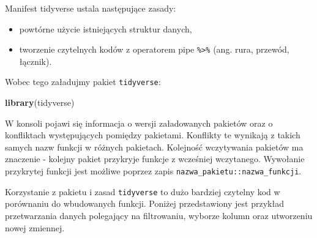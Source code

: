 \documentclass[]{book}
\newenvironment{Shaded}{\begin{snugshade}}{\end{snugshade}}
\newcommand{\KeywordTok}[1]{\textcolor[rgb]{0.13,0.29,0.53}{\textbf{#1}}}
\newcommand{\DataTypeTok}[1]{\textcolor[rgb]{0.13,0.29,0.53}{#1}}
\newcommand{\DecValTok}[1]{\textcolor[rgb]{0.00,0.00,0.81}{#1}}
\newcommand{\StringTok}[1]{\textcolor[rgb]{0.31,0.60,0.02}{#1}}
\newcommand{\CommentTok}[1]{\textcolor[rgb]{0.56,0.35,0.01}{\textit{#1}}}
\newcommand{\OperatorTok}[1]{\textcolor[rgb]{0.81,0.36,0.00}{\textbf{#1}}}
\newcommand{\NormalTok}[1]{#1}
\providecommand{\tightlist}{%
  \setlength{\itemsep}{0pt}\setlength{\parskip}{0pt}}
\begin{document}
Manifest tidyverse ustala następujące zasady:

\begin{itemize}
\tightlist
\item
  powtórne użycie istniejących struktur danych,
\item
  tworzenie czytelnych kodów z operatorem pipe
  \texttt{\%\textgreater{}\%} (ang. rura, przewód, łącznik).
\end{itemize}

Wobec tego załadujmy pakiet \texttt{tidyverse}:

\begin{Shaded}
\begin{Highlighting}[]
\KeywordTok{library}\NormalTok{(tidyverse)}
\end{Highlighting}
\end{Shaded}

W konsoli pojawi się informacja o wersji załadowanych pakietów oraz o
konfliktach występujących pomiędzy pakietami. Konflikty te wynikają z
takich samych nazw funkcji w różnych pakietach. Kolejność wczytywania
pakietów ma znaczenie - kolejny pakiet przykryje funkcje z wcześniej
wczytanego. Wywołanie przykrytej funkcji jest możliwe poprzez zapis
\texttt{nazwa\_pakietu::nazwa\_funkcji}.

Korzystanie z pakietu i zasad \texttt{tidyverse} to dużo bardziej
czytelny kod w porównaniu do wbudowanych funkcji. Poniżej przedstawiony
jest przykład przetwarzania danych polegający na filtrowaniu, wyborze
kolumn oraz utworzeniu nowej zmiennej.

\begin{Shaded}
\end{Shaded}
\end{document}

